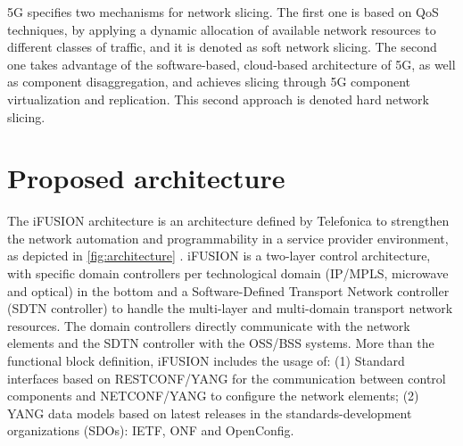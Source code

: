 \documentclass[journal,article,submit,moreauthors,pdftex]{Definitions/mdpi}
\begin{document}

5G specifies two mechanisms for network slicing. The first one is based on QoS techniques, by applying a dynamic allocation of available network resources to different classes of traffic, and it is denoted as soft network slicing. The second one takes advantage of the software-based, cloud-based architecture of 5G, as well as component disaggregation, and achieves slicing through 5G component virtualization and replication. This second approach is denoted hard network slicing.


\section{Proposed architecture}
\label{sec:arch}

The i\uppercase{FUSION} architecture is an architecture defined by Telefonica to strengthen the network automation and programmability in a service provider environment, as depicted in \cref{fig:architecture} \cite{contreras2019ifusion}. i\uppercase{FUSION} is a two-layer control architecture, with specific domain controllers per technological domain (IP/MPLS, microwave and optical) in the bottom and a Software-Defined Transport Network controller (SDTN controller) to handle the multi-layer and multi-domain transport network resources.  The domain controllers directly communicate with the network elements and the SDTN controller with the OSS/BSS systems. More than the functional block definition, i\uppercase{FUSION} includes the usage of: (1) Standard interfaces based on \uppercase{RESTconf/YANG} \cite{bierman2017restconf} for the communication between control components and \uppercase{NETCONF/YANG} \cite{enns2011network} to configure the network elements; (2) YANG data models based on latest releases in the standards-development organizations (SDOs): \uppercase{IETF}, \uppercase{ONF} and OpenConfig.
\end{document}
